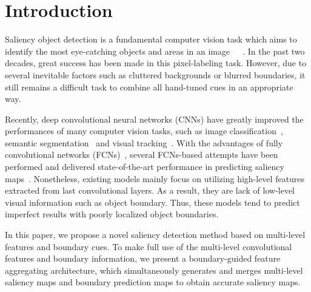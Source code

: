 \documentclass[journal]{IEEEtran}
\begin{document}
\IEEEpeerreviewmaketitle

\section{Introduction}
\label{sec:intro}
Saliency object detection is a fundamental computer vision task which aims to identify the most eye-catching objects and areas in an image~\cite{Itti1998A}\cite{Achanta2009Frequency}~\cite{Tong2015Salient}~\cite{Wang2015Deep}.
%
In the past two decades, great success has been made in this pixel-labeling task.
%
However, due to several inevitable factors such as cluttered backgrounds or blurred boundaries, it still remains a difficult task to combine all hand-tuned cues in an appropriate way.

Recently, deep convolutional neural networks (CNNs) have greatly improved the performances of many computer vision tasks, such as image classification~\cite{Krizhevsky2012ImageNet}, semantic segmentation~\cite{FCN} and visual tracking~\cite{Wang2016STCT,zhang2018non}.
%
%
With the advantages of fully convolutional networks (FCNs)~\cite{FCN}, several FCNs-based attempts have been performed and delivered state-of-the-art performance in predicting saliency maps~\cite{Wang2016Saliency,Lee2016Deep,Liu2016DHSNet}.
%
Nonetheless, existing models mainly focus on utilizing high-level features extracted from last convolutional layers.
%
As a result, they are lack of low-level visual information such as object boundary.
%
Thus, these models tend to predict imperfect results with poorly localized object boundaries.

In this paper, we propose a novel saliency detection method based on multi-level features and boundary cues.
%
To make full use of the multi-level convolutional features and boundary information, we present a boundary-guided feature aggregating architecture, which simultaneously generates and merges multi-level saliency maps and boundary prediction maps to obtain accurate saliency maps.
\end{document}
